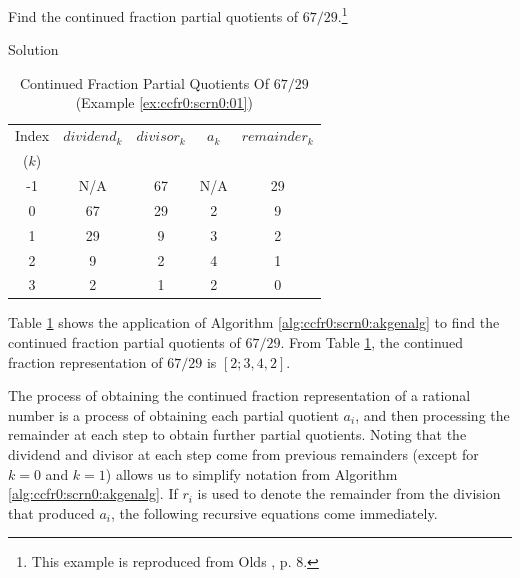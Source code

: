 \begin{vworkexamplestatement}
\label{ex:ccfr0:scrn0:01}
Find the continued fraction partial quotients of 
$67/29$.\footnote{This example is reproduced from
Olds \cite{bibref:b:OldsClassic}, p. 8.}
\end{vworkexamplestatement}
\begin{vworkexampleparsection}{Solution}
\begin{table}
\caption{Continued Fraction Partial Quotients Of $67/29$ (Example \ref{ex:ccfr0:scrn0:01})}
\label{tbl:ccfr0:scrn0:01}
\begin{center}
\begin{tabular}{|c|c|c|c|c|}
\hline
\small{Index} & \small{$dividend_k$}  & \small{$divisor_k$} & \small{$a_k$}   & \small{$remainder_k$} \\
\small{($k$)} &                       &                     &                 &                       \\
\hline
\hline
\small{-1}    & \small{N/A}           & \small{67}          & \small{N/A}     & \small{29}            \\
\hline
\small{0}     & \small{67}            & \small{29}          & \small{2}       & \small{9}             \\
\hline
\small{1}     & \small{29}            & \small{9}           & \small{3}       & \small{2}             \\
\hline
\small{2}     & \small{9}             & \small{2}           & \small{4}       & \small{1}             \\
\hline
\small{3}     & \small{2}             & \small{1}           & \small{2}       & \small{0}             \\
\hline
\end{tabular}
\end{center}
\end{table}
Table \ref{tbl:ccfr0:scrn0:01} shows the application of 
Algorithm \ref{alg:ccfr0:scrn0:akgenalg} to find the
continued fraction partial quotients of $67/29$.  From
Table \ref{tbl:ccfr0:scrn0:01}, the continued fraction
representation of $67/29$ is $[2;3,4,2]$.
\end{vworkexampleparsection}
\vworkexamplefooter{}

The process of obtaining the continued fraction representation of
a rational number is a 
process of obtaining each partial quotient $a_i$, and then processing the
remainder at each step to obtain further partial quotients.  Noting that
the dividend and divisor at each step come from previous remainders
(except for $k=0$ and $k=1$) allows us to simplify notation from
Algorithm \ref{alg:ccfr0:scrn0:akgenalg}.  If $r_i$ is used to
denote the remainder from the division that produced $a_i$, the following
recursive equations come immediately.

